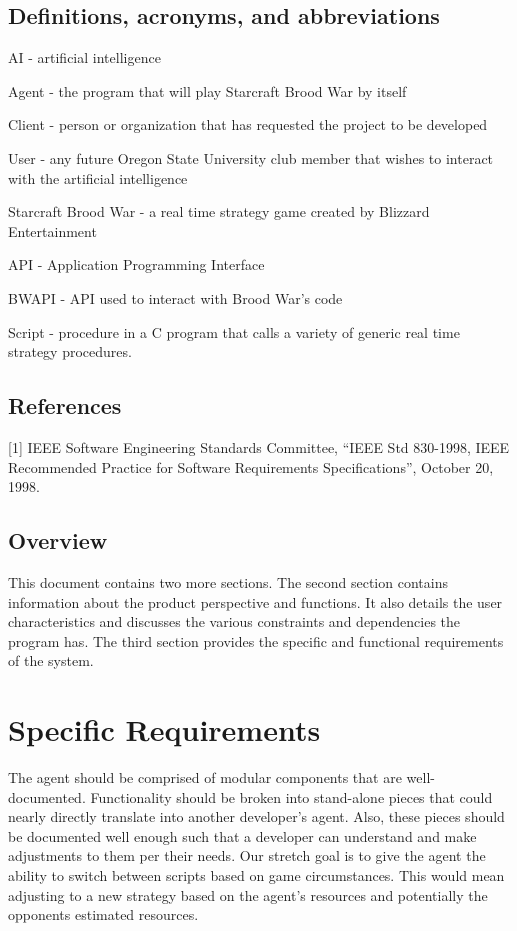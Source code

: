 \documentclass[10pt,letterpaper,onecolumn,draftclsnofoot]{IEEEtran}
\begin{document}
\subsection{Definitions, acronyms, and abbreviations}
AI - artificial intelligence

Agent - the program that will play Starcraft Brood War by itself

Client - person or organization that has requested the project to be developed

User - any future Oregon State University club member that wishes to interact with the artificial intelligence

Starcraft Brood War - a real time strategy game created by Blizzard Entertainment

API - Application Programming Interface

BWAPI - API used to interact with Brood War's code

Script - procedure in a C program that calls a variety of generic real time strategy procedures.

\subsection{References}
[1] IEEE Software Engineering Standards Committee, “IEEE Std 830-1998, IEEE Recommended Practice for Software Requirements Specifications”, October 20, 1998.

\subsection{Overview}
This document contains two more sections. The second section contains information about the product perspective and functions. It also details the user characteristics and discusses the various constraints and dependencies the program has. The third section provides the specific and functional requirements of the system.

\newpage




\newpage

\section{Specific Requirements}
The agent should be comprised of modular components that are well-documented. Functionality should be broken into stand-alone pieces that could nearly directly translate into another developer's agent. Also, these pieces should be documented well enough such that a developer can understand and make adjustments to them per their needs. Our stretch goal is to give the agent the ability to switch between scripts based on game circumstances. This would mean adjusting to a new strategy based on the agent's resources and potentially the opponents estimated resources.
\end{document}
